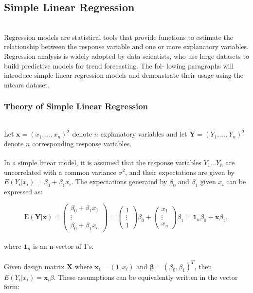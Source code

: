 \documentclass{article}\usepackage[]{graphicx}\usepackage[]{xcolor}
\numberwithin{equation}{section}
\begin{document}
\subsection{Simple Linear Regression}
\\Regression models are statistical tools that provide functions to estimate the relationship between the response variable and one or more explanatory variables. Regression analysis is widely adopted by data scientists, who use large datasets to build predictive models for trend forecasting. The fol- lowing paragraphs will introduce simple linear regression models and demonstrate their usage using the mtcars dataset.

\subsubsection{Theory of Simple Linear Regression} 

\\Let $\mathbf{x} = (x_1, \dots, x_n)^T$ denote $n$ explanatory variables and let $\mathbf{Y} = (Y_1, \dots, Y_n)^T$ denote $n$ corresponding response variables.
\\  
\\In a simple linear model, it is assumed that the response variables $Y_1 \dots Y_n$ are uncorrelated with a common variance $\sigma^2$, and their expectations are given by $E(Y_i| x_i) = \beta_0 + \beta_1 x_i$. The expectations generated by $\beta_0$ and $\beta_1$ given $x_i$ can be expressed as:

\begin{equation}\label{eq:4-1}
\mathrm{E}(\mathbf{Y} | \mathbf{x}) =
\left( \begin{array}{ccc}
\beta_0+\beta_1 x_1\\
\vdots\\
\beta_0+\beta_1 x_n
\end{array} \right) = 
\left( \begin{array}{ccc}
1\\
\vdots\\
1
\end{array} \right) \beta_0 + 
\left( \begin{array}{ccc}
x_1\\
\vdots\\
x_n
\end{array} \right) \beta_1 =
\mathbf{1}_n \beta_0 + \mathbf{x} \beta_1 ,
\end{equation}
\\
\noindent
where $\mathbf{1}_n$ is an n-vector of 1's.
\\  
\\Given design matrix $\mathbf{X}$ where $\mathbf{x}_i = (1, x_i)$ and $\mathbf{\beta} = (\beta_0, \beta_1)^T$, then $E(Y_i|x_i) = \mathbf{x}_i \beta$. These assumptions can be equivalently written in the vector form:
\end{document}
